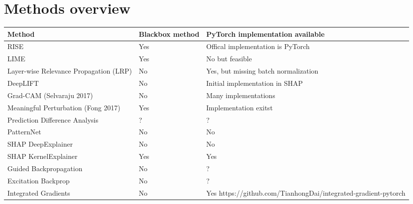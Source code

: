 \section{Methods overview}

\begin{tabular}{| p{7cm} | p{2.5cm} | p{6cm} | }
\hline
\textbf{Method} & \textbf{Blackbox method} & \textbf{PyTorch implementation available} \\ \hline

RISE\cite{Petsiuk2018rise} & Yes & Offical implementation is PyTorch \\ \hline
LIME\cite{ribeiro2016should} & Yes & No but feasible \\ \hline
Layer-wise Relevance Propagation (LRP) & No & Yes, but missing batch normalization\cite{lrppytorch} \\ \hline
DeepLIFT\cite{shrikumar2017learning} & No & Initial implementation in SHAP\cite{NIPS2017_7062} \\ \hline
Grad-CAM (Selvaraju 2017) & No & Many implementations \\ \hline
Meaningful Perturbation (Fong 2017)\cite{fong2017interpretable} & Yes & Implementation exitst \cite{fong2017implementation} \\ \hline

Prediction Difference Analysis \cite{todo} & ? & ? \\ \hline
PatternNet & No & No \\ \hline
SHAP DeepExplainer\cite{NIPS2017_7062} & No & No \\ \hline
SHAP KernelExplainer\cite{NIPS2017_7062} & Yes & Yes \\ \hline

Guided Backpropagation  & No & ? \\ \hline
Excitation Backprop \cite{todo} & No & ? \\ \hline

Integrated Gradients & No & Yes https://github.com/TianhongDai/integrated-gradient-pytorch  \\ \hline

\end{tabular}



